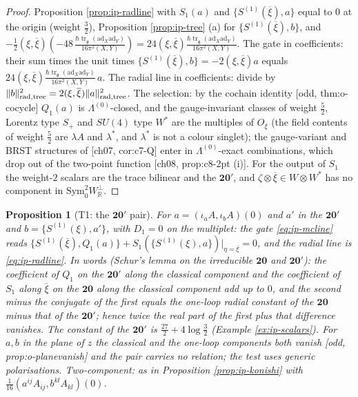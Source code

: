 \documentclass[11pt]{report}
\theoremstyle{plain}
\newtheorem{proposition}[theorem]{Proposition}
\theoremstyle{definition}
\numberwithin{equation}{chapter}
\newcommand{\unit}{\tfrac{\hbar\operatorname{tr}_{\mathfrak g}(\mathrm{ad}_X\mathrm{ad}_Y)}{16\pi^2(X,Y)}}
\newcommand{\Wp}{W_{\mathbb R}^\perp}
\newcommand{\rad}{{\rm rad}}
\begin{document}
\begin{proof}
Proposition \ref{prop:ip-radline} with $S_1(a)$ and $\{S^{(1)}(\overline\xi),a\}$ equal to $0$ at the origin (weight $\tfrac32$), Proposition \ref{prop:ip-tree} (a) for $\{S^{(1)}(\overline\xi),b\}$, and $-\tfrac12(\xi,\overline\xi)(-48\,\unit)=24(\xi,\overline\xi)\unit$. The gate in coefficients: their sum times the unit times $\{S^{(1)}(\overline\xi),b\}=-2(\xi,\overline\xi)a$ equals $24(\xi,\overline\xi)\unit\,a$. The radial line in coefficients: divide by $\|b\|^2_{\rad,{\rm tree}}=2(\xi,\overline\xi)\|a\|^2_{\rad,{\rm tree}}$. The selection: by the cochain identity [odd, thm:o-cocycle] $Q_1(a)$ is $\Lambda^{(0)}$-closed, and the gauge-invariant classes of weight $\tfrac52$, Lorentz type $S_+$ and $SU(4)$ type $W^*$ are the multiples of $O_\xi$ (the field contents of weight $\tfrac52$ are $\lambda A$ and $\lambda^*$, and $\lambda^*$ is not a colour singlet); the gauge-variant and BRST structures of [ch07, cor:c7-Q] enter in $\Lambda^{(0)}$-exact combinations, which drop out of the two-point function [ch08, prop:c8-2pt (i)]. For the output of $S_1$ the weight-$2$ scalars are the trace bilinear and the $\mathbf{20'}$, and $\zeta\otimes\overline\xi\in W\otimes W^*$ has no component in $\mathrm{Sym}^2_0\Wp$.
\end{proof}

\begin{proposition}[T1: the $\mathbf{20'}$ pair]
\label{prop:ip-twenty}
For $a=(\iota_aA,\iota_bA)(0)$ and $a'$ in the $\mathbf{20'}$ and $b=\{S^{(1)}(\xi),a'\}$, with $D_1=0$ on the multiplet: the gate \eqref{eq:ip-mcline} reads $\{S^{(1)}(\overline\xi),Q_1(a)\}+S_1(\{S^{(1)}(\xi),a\})|_{\eta=\overline\xi}=0$, and the radial line is \eqref{eq:ip-radline}. In words (Schur's lemma on the irreducible $\mathbf{20}$ and $\mathbf{20'}$): the coefficient of $Q_1$ on the $\mathbf{20'}$ along the classical component and the coefficient of $S_1$ along $\overline\xi$ on the $\mathbf{20}$ along the classical component add up to $0$, and the second minus the conjugate of the first equals the one-loop radial constant of the $\mathbf{20}$ minus that of the $\mathbf{20'}$; hence twice the real part of the first plus that difference vanishes. The constant of the $\mathbf{20'}$ is $\tfrac{27}2+4\log\tfrac32$ (Example \ref{ex:ip-scalars}). For $a,b$ in the plane of $z$ the classical and the one-loop components both vanish [odd, prop:o-planevanish] and the pair carries no relation; the test uses generic polarisations. Two-component: as in Proposition \ref{prop:ip-konishi} with $\tfrac1{16}(a^{ij}A_{ij},b^{kl}A_{kl})(0)$.
\end{proposition}
\end{document}
